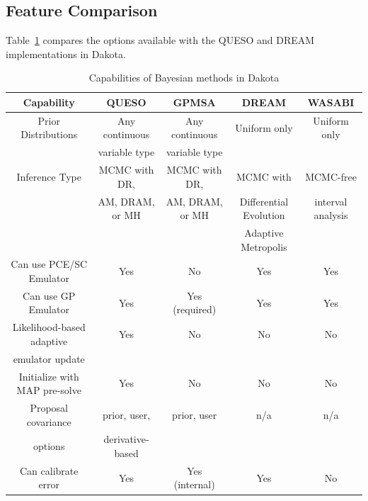 \subsection{Feature Comparison}
Table~\ref{tab:bayes_comparison} compares the options available 
with the QUESO and DREAM implementations in Dakota. 

\begin{table}
\centering
\caption{Capabilities of Bayesian methods in Dakota}
\label{tab:bayes_comparison}
\begin{tabular}{|c|c|c|c|c|}
\hline
Capability           &  QUESO  & GPMSA & DREAM & WASABI \\
\hline
Prior Distributions  &  Any continuous &  Any continuous & Uniform only & Uniform only \\
                     &  variable type  &  variable type  &              &              \\
\hline
Inference Type                 & MCMC with DR,   & MCMC with DR,   & MCMC with              & MCMC-free         \\
                               & AM, DRAM, or MH & AM, DRAM, or MH & Differential Evolution & interval analysis \\
                               &                 &                 & Adaptive Metropolis    &                   \\
\hline
Can use PCE/SC Emulator        &  Yes            & No              & Yes                    & Yes \\
\hline
Can use GP Emulator            &  Yes            & Yes (required)  & Yes                    & Yes \\
\hline
Likelihood-based adaptive      &  Yes            &  No             & No                     & No \\     
emulator update                &                 &                 &                        &    \\
\hline
Initialize with MAP pre-solve  &  Yes            &  No             & No                     & No \\
\hline
Proposal covariance            &  prior, user,     &  prior, user  & n/a                    & n/a \\            
options                        &  derivative-based &               &                        & \\
\hline
Can calibrate error            &  Yes            &  Yes (internal) & Yes                    & No          \\                

\end{tabular}
\end{table}
